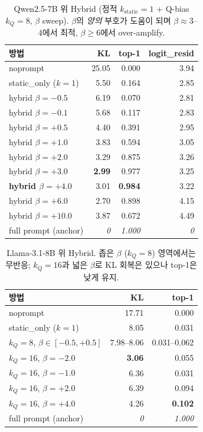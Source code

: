 \documentclass{article}
\theoremstyle{definition}
\begin{document}
\begin{table}[h]
\centering
\caption{Qwen2.5-7B 위 Hybrid (정적 $k_{\mathrm{static}}{=}1$ + Q-bias $k_{Q}{=}8$, $\beta$ sweep). $\beta$의 \emph{양의} 부호가 도움이 되며 $\beta{\approx}3$--$4$에서 최적, $\beta{\geq}6$에서 over-amplify.}
\label{tab:qbias-qwen}
\small
\begin{tabular}{lrrr}
\toprule
방법 & KL & top-1 & logit\_resid \\
\midrule
noprompt & 25.05 & 0.000 & 3.94 \\
static\_only ($k{=}1$) & 5.50 & 0.164 & 2.85 \\
\midrule
hybrid $\beta{=}{-}0.5$ & 6.19 & 0.070 & 2.81 \\
hybrid $\beta{=}{-}0.1$ & 5.68 & 0.117 & 2.83 \\
hybrid $\beta{=}{+}0.5$ & 4.40 & 0.391 & 2.95 \\
hybrid $\beta{=}{+}1.0$ & 3.83 & 0.594 & 3.05 \\
hybrid $\beta{=}{+}2.0$ & 3.29 & 0.875 & 3.26 \\
hybrid $\beta{=}{+}3.0$ & \textbf{2.99} & 0.977 & 3.25 \\
\textbf{hybrid $\beta{=}{+}4.0$} & 3.01 & \textbf{0.984} & 3.22 \\
hybrid $\beta{=}{+}6.0$ & 2.70 & 0.898 & 4.15 \\
hybrid $\beta{=}{+}10.0$ & 3.87 & 0.672 & 4.49 \\
\midrule
full prompt (anchor) & \textit{0} & \textit{1.000} & \textit{0} \\
\bottomrule
\end{tabular}
\end{table}

\begin{table}[h]
\centering
\caption{Llama-3.1-8B 위 Hybrid. 좁은 $\beta$ ($k_{Q}{=}8$) 영역에서는 무반응; $k_{Q}{=}16$과 넓은 $\beta$로 KL 회복은 있으나 top-1은 낮게 유지.}
\label{tab:qbias-llama}
\small
\begin{tabular}{lrr}
\toprule
방법 & KL & top-1 \\
\midrule
noprompt & 17.71 & 0.000 \\
static\_only ($k{=}1$) & 8.05 & 0.031 \\
\midrule
$k_Q{=}8$, $\beta\in[-0.5, +0.5]$ & 7.98--8.06 & 0.031--0.062 \\
\midrule
$k_Q{=}16$, $\beta{=}{-}2.0$ & \textbf{3.06} & 0.055 \\
$k_Q{=}16$, $\beta{=}{-}1.0$ & 6.36 & 0.031 \\
$k_Q{=}16$, $\beta{=}{+}2.0$ & 6.39 & 0.094 \\
$k_Q{=}16$, $\beta{=}{+}4.0$ & 4.26 & \textbf{0.102} \\
\midrule
full prompt (anchor) & \textit{0} & \textit{1.000} \\
\bottomrule
\end{tabular}
\end{table}
\end{document}
